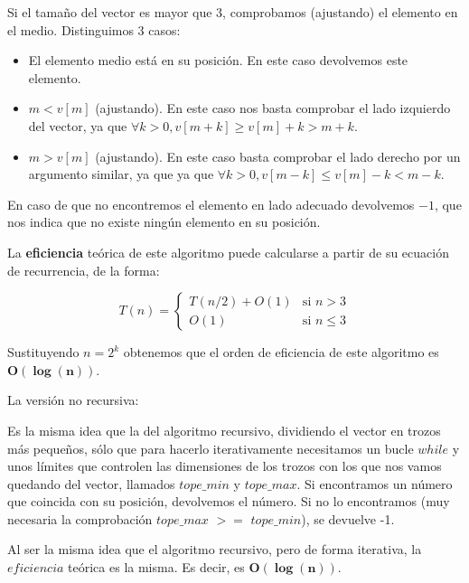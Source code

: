 Si el tamaño del vector es mayor que 3, comprobamos (ajustando) el elemento en el medio.
Distinguimos 3 casos:

\begin{itemize}
  \item El elemento medio está en su posición. En este caso devolvemos este elemento.
  \item $m < v[m]$ (ajustando). En este caso nos basta comprobar el lado izquierdo del vector, ya que $\forall k > 0, v[m + k] \geq v[m] + k > m + k$.
  \item $m > v[m]$ (ajustando). En este caso basta comprobar el lado derecho por un argumento similar, ya que ya que $\forall k > 0, v[m - k] \leq v[m] - k < m - k$.
\end{itemize}

En caso de que no encontremos el elemento en lado adecuado devolvemos $-1$, que nos indica que no existe ningún elemento en su posición.

La \textbf{eficiencia} teórica de este algoritmo puede calcularse a partir de su ecuación de recurrencia, de la forma:

\[
T(n) = \begin{cases} T(n/2) + O(1) & \mbox{si } n > 3 \\
O(1) & \mbox{si } n \leq 3 \end{cases}\]

Sustituyendo $n = 2^k$ obtenemos que el orden de eficiencia de este algoritmo es $\mathbf{O(\log(n))}$.

\vspace*{1cm}
\hrulefill
\vspace*{1cm}

La versión no recursiva:




Es la misma idea que la del algoritmo recursivo, dividiendo el vector en trozos más pequeños, sólo que para hacerlo iterativamente necesitamos un bucle $while$ y unos límites que controlen las dimensiones de los trozos con los que nos vamos quedando del vector, llamados $tope\_min$ y $tope\_max$.  Si encontramos un número que coincida con su posición, devolvemos el número. Si no lo encontramos (muy necesaria la comprobación $tope\_max$ $>=$ $tope\_min$), se devuelve -1.


Al ser la misma idea que el algoritmo recursivo, pero de forma iterativa, la $eficiencia$ teórica es la misma. Es decir, es  $\mathbf{O(\log(n))}$.

